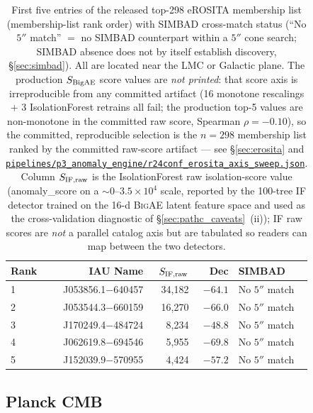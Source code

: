 \documentclass[aps,prd,twocolumn,superscriptaddress,showpacs,preprintnumbers,nofootinbib,longbibliography,floatfix]{revtex4-2}
\newcommand{\repoBase}{https://github.com/Hubify-Projects/bigbounce/blob/main}
\newcommand{\artifact}[1]{\href{\repoBase/#1}{\nolinkurl{#1}}}
\newcommand{\BigAE}{\textsc{BigAE}}
\begin{document}
\begin{table}[tb]
\caption{\label{tab:erosita_top} First five entries of the released top-298 eROSITA membership list (membership-list rank order) with SIMBAD cross-match status (``No $5''$ match'' $=$ no SIMBAD counterpart within a $5''$ cone search; SIMBAD absence does not by itself establish discovery, \S\ref{sec:simbad}). All are located near the LMC or Galactic plane. The production $S_{\rm BigAE}$ score values are \emph{not printed}: that score axis is irreproducible from any committed artifact (16 monotone rescalings $+$ 3 IsolationForest retrains all fail; the production top-5 values are non-monotone in the committed raw score, Spearman $\rho = -0.10$), so the committed, reproducible selection is the $n=298$ membership list ranked by the committed raw-score artifact --- see \S\ref{sec:erosita} and \artifact{pipelines/p3\_anomaly\_engine/r24conf\_erosita\_axis\_sweep.json}. Column $S_{\rm IF,raw}$ is the IsolationForest raw isolation-score value (anomaly\_score on a $\sim 0$--$3.5\times 10^{4}$ scale, reported by the 100-tree IF detector trained on the 16-d \BigAE{} latent feature space and used as the cross-validation diagnostic of \S\ref{sec:pathc_caveats}~(ii)); IF raw scores are \emph{not} a parallel catalog axis but are tabulated so readers can map between the two detectors.}
\begin{ruledtabular}
\begin{tabular}{lrrrl}
\textbf{Rank} & \textbf{IAU Name} & \textbf{$S_{\rm IF,raw}$} & \textbf{Dec} & \textbf{SIMBAD} \\
\hline
1 & J053856.1$-$640457 & 34{,}182 & $-64.1$ & No $5''$ match \\
2 & J053544.3$-$660159 & 16{,}270 & $-66.0$ & No $5''$ match \\
3 & J170249.4$-$484724 &  8{,}234 & $-48.8$ & No $5''$ match \\
4 & J062619.8$-$694546 &  5{,}955 & $-69.8$ & No $5''$ match \\
5 & J152039.9$-$570955 &  4{,}424 & $-57.2$ & No $5''$ match \\
\end{tabular}
\end{ruledtabular}
\end{table}


\subsection{Planck CMB}\label{sec:planck}
\end{document}
